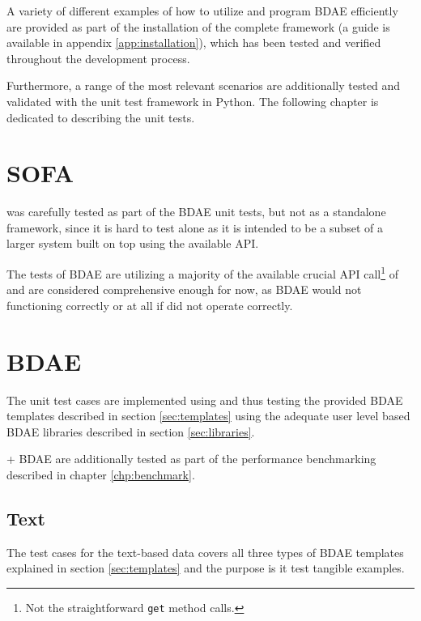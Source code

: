 A variety of different examples of how to utilize and program BDAE efficiently are provided as part of the installation of the complete framework (a guide is available in appendix \ref{app:installation}), which has been tested and verified throughout the development process. 

Furthermore, a range of the most relevant scenarios are additionally tested and validated with the unit test framework\cite{PageUnitTest} in Python. The following chapter is dedicated to describing the unit tests.

\section{SOFA}
\CodeName was carefully tested as part of the BDAE unit tests, but not as a standalone framework, since it is hard to test alone as it is intended to be a subset of a larger system built on top using the available API. 

The tests of BDAE are utilizing a majority of the available crucial API call\footnote{Not the straightforward \texttt{get} method calls.} of \CodeName and are considered comprehensive enough for now, as BDAE would not functioning correctly or at all if \CodeName did not operate correctly.

\section{BDAE}
The unit test cases are implemented using and thus testing the provided BDAE templates described in section \ref{sec:templates} using the adequate user level based BDAE libraries described in section \ref{sec:libraries}.
\newline

\CodeName + BDAE are additionally tested as part of the performance benchmarking described in chapter \ref{chp:benchmark}.

\subsection*{Text}
The test cases for the text-based data covers all three types of BDAE templates explained in section \ref{sec:templates} and the purpose is it test tangible examples.

